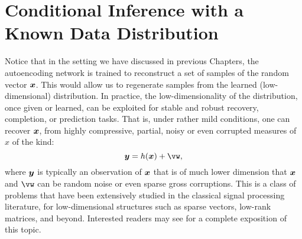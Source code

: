 \documentclass[../../book-main.tex]{subfiles}
\begin{document}




\section{Conditional Inference with a Known Data Distribution}
Notice that in the setting we have discussed in previous Chapters, the
autoencoding network is trained to reconstruct a set of samples of the random vector $\bm{x}$. This would allow us to regenerate samples from  the learned (low-dimensional) distribution. In practice, the low-dimensionality of the distribution, once given or learned, can be exploited for stable and robust recovery, completion, or prediction tasks. That is, under rather mild conditions, one can recover $\bm{x}$, from highly compressive, partial, noisy or even corrupted measures of $x$ of the kind:
\begin{equation}
    \y = h(\x) + \vw,
\end{equation}
where $\bm{y}$ is typically an observation of $\bm{x}$ that is of much lower dimension that $\bm{x}$ and $\vw$ can be random noise or even sparse gross corruptions. This is a class of problems that have been extensively studied in the classical signal processing literature, for low-dimensional structures such as sparse vectors, low-rank matrices, and beyond. Interested readers may see \cite{Wright-Ma-2022} for a complete exposition of this topic.
\end{document}
